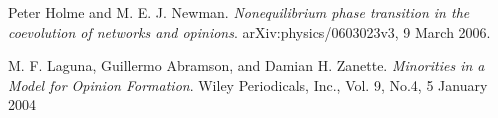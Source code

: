 \documentclass[11pt]{article}
\begin{document}
\begin{thebibliography}{99}
 Peter Holme and M. E. J. Newman. \textit{Nonequilibrium phase transition in the coevolution of networks and opinions}. arXiv:physics/0603023v3, 9 March 2006.

 M. F. Laguna, Guillermo Abramson, and Damian H. Zanette. \textit{Minorities in a Model for Opinion Formation}. Wiley Periodicals, Inc., Vol. 9, No.4, 5 January 2004

\end{thebibliography} 



\end{document}
